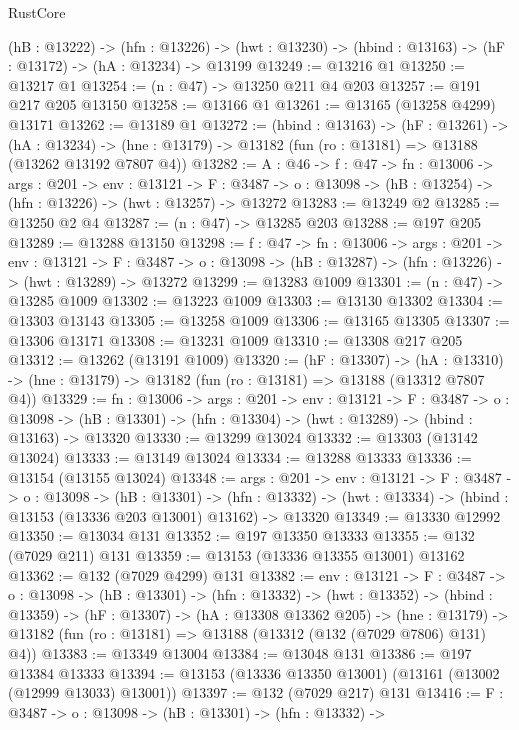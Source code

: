 \begin{lexlean}{RustCore}
\begin{coremodule}
  (hB : @13222) ->
  (hfn : @13226) -> (hwt : @13230) -> (hbind : @13163) -> (hF : @13172) -> (hA : @13234) -> @13199
@13249 := @13216 @1
@13250 := @13217 @1
@13254 := (n : @47) -> @13250 @211 @4 @203
@13257 := @191 @217 @205 @13150
@13258 := @13166 @1
@13261 := @13165 (@13258 @4299) @13171
@13262 := @13189 @1
@13272 := (hbind : @13163) ->
  (hF : @13261) ->
  (hA : @13234) -> (hne : @13179) -> @13182 (fun (ro : @13181) => @13188 (@13262 @13192 @7807 @4))
@13282 := {A : @46} ->
  {f : @47} ->
  {fn : @13006} ->
  {args : @201} ->
  {env : @13121} ->
  {F : @3487} -> {o : @13098} -> (hB : @13254) -> (hfn : @13226) -> (hwt : @13257) -> @13272
@13283 := @13249 @2
@13285 := @13250 @2 @4
@13287 := (n : @47) -> @13285 @203
@13288 := @197 @205
@13289 := @13288 @13150
@13298 := {f : @47} ->
  {fn : @13006} ->
  {args : @201} ->
  {env : @13121} ->
  {F : @3487} -> {o : @13098} -> (hB : @13287) -> (hfn : @13226) -> (hwt : @13289) -> @13272
@13299 := @13283 @1009
@13301 := (n : @47) -> @13285 @1009
@13302 := @13223 @1009
@13303 := @13130 @13302
@13304 := @13303 @13143
@13305 := @13258 @1009
@13306 := @13165 @13305
@13307 := @13306 @13171
@13308 := @13231 @1009
@13310 := @13308 @217 @205
@13312 := @13262 (@13191 @1009)
@13320 := (hF : @13307) ->
  (hA : @13310) -> (hne : @13179) -> @13182 (fun (ro : @13181) => @13188 (@13312 @7807 @4))
@13329 := {fn : @13006} ->
  {args : @201} ->
  {env : @13121} ->
  {F : @3487} ->
  {o : @13098} -> (hB : @13301) -> (hfn : @13304) -> (hwt : @13289) -> (hbind : @13163) -> @13320
@13330 := @13299 @13024
@13332 := @13303 (@13142 @13024)
@13333 := @13149 @13024
@13334 := @13288 @13333
@13336 := @13154 (@13155 @13024)
@13348 := {args : @201} ->
  {env : @13121} ->
  {F : @3487} ->
  {o : @13098} ->
  (hB : @13301) ->
  (hfn : @13332) -> (hwt : @13334) -> (hbind : @13153 (@13336 @203 @13001) @13162) -> @13320
@13349 := @13330 @12992
@13350 := @13034 @131
@13352 := @197 @13350 @13333
@13355 := @132 (@7029 @211) @131
@13359 := @13153 (@13336 @13355 @13001) @13162
@13362 := @132 (@7029 @4299) @131
@13382 := {env : @13121} ->
  {F : @3487} ->
  {o : @13098} ->
  (hB : @13301) ->
  (hfn : @13332) ->
  (hwt : @13352) ->
  (hbind : @13359) ->
  (hF : @13307) ->
  (hA : @13308 @13362 @205) ->
  (hne : @13179) -> @13182 (fun (ro : @13181) => @13188 (@13312 (@132 (@7029 @7806) @131) @4))
@13383 := @13349 @13004
@13384 := @13048 @131
@13386 := @197 @13384 @13333
@13394 := @13153 (@13336 @13350 @13001) (@13161 (@13002 (@12999 @13033) @13001))
@13397 := @132 (@7029 @217) @131
@13416 := {F : @3487} ->
  {o : @13098} ->
  (hB : @13301) ->
  (hfn : @13332) ->

\end{coremodule}
\end{lexlean}
